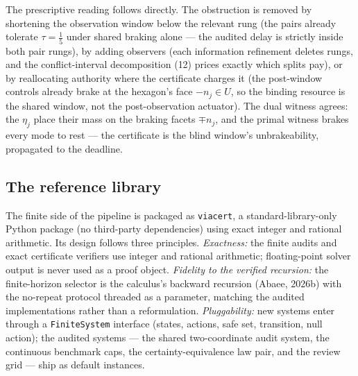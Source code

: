 \documentclass[10pt,twocolumn]{article}
\theoremstyle{plain}
\theoremstyle{definition}
\theoremstyle{remark}
\begin{document}
The prescriptive reading follows directly. The obstruction is removed by
shortening the observation window below the relevant rung (the pairs
already tolerate \(\tau = \tfrac15\) under shared braking alone ---
the audited delay is strictly inside both pair rungs), by adding
observers (each information refinement deletes rungs, and the
conflict-interval decomposition (12) prices exactly which splits pay), or
by reallocating authority where the certificate charges it (the post-window
controls already brake at the hexagon's face \(-n_j \in U\), so the
binding resource is the shared window, not the post-observation actuator).
The dual witness agrees: the \(\eta_j\) place their mass on the braking
facets \(\mp n_j\), and the primal witness brakes every mode to rest ---
the certificate is the blind window's unbrakeability, propagated to the
deadline.

\subsection{The reference library}\label{library}

The finite side of the pipeline is packaged as \texttt{viacert}, a
standard-library-only Python package (no third-party dependencies) using
exact integer and rational arithmetic.
Its design follows three principles. \emph{Exactness:} the finite audits and exact certificate verifiers use
integer and rational arithmetic; floating-point solver output is never used
as a proof object.
\emph{Fidelity to the verified recursion:} the finite-horizon selector is the
calculus's backward recursion (Abaee, 2026b) with the no-repeat protocol
threaded as a parameter, matching the audited implementations rather than a
reformulation. \emph{Pluggability:} new systems enter through a
\texttt{FiniteSystem} interface (states, actions, safe set, transition, null
action); the audited systems --- the shared two-coordinate audit system, the
continuous benchmark caps, the certainty-equivalence law pair, and the
review grid --- ship as default instances.
\end{document}
